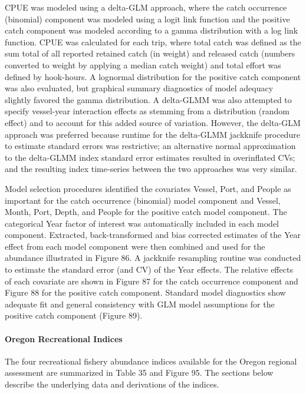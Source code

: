 \documentclass[11pt,
  english,
  letterpaper,
]{article}
\begin{document}
CPUE was modeled using a delta-GLM approach, where the catch occurrence (binomial) component was modeled using a logit link function and the positive catch component was modeled according to a gamma distribution with a log link function. CPUE was calculated for each trip, where total catch was defined as the sum total of all reported retained catch (in weight) and released catch (numbers converted to weight by applying a median catch weight) and total effort was defined by hook-hours. A lognormal distribution for the positive catch component was also evaluated, but graphical summary diagnostics of model adequacy slightly favored the gamma distribution. A delta-GLMM was also attempted to specify vessel-year interaction effects as stemming from a distribution (random effect) and to account for this added source of variation. However, the delta-GLM approach was preferred because runtime for the delta-GLMM jackknife procedure to estimate standard errors was restrictive; an alternative normal approximation to the delta-GLMM index standard error estimates resulted in overinflated CVs; and the resulting index time-series between the two approaches was very similar.

Model selection procedures identified the covariates Vessel, Port, and People as important for the catch occurrence (binomial) model component and Vessel, Month, Port, Depth, and People for the positive catch model component. The categorical Year factor of interest was automatically included in each model component. Extracted, back-transformed and bias corrected estimates of the Year effect from each model component were then combined and used for the abundance illustrated in Figure 86. A jackknife resampling routine was conducted to estimate the standard error (and CV) of the Year effects. The relative effects of each covariate are shown in Figure 87 for the catch occurrence component and Figure 88 for the positive catch component. Standard model diagnostics show adequate fit and general consistency with GLM model assumptions for the positive catch component (Figure 89).

\hypertarget{oregon-recreational-indices}{%
\paragraph{Oregon Recreational Indices}\label{oregon-recreational-indices}}

The four recreational fishery abundance indices available for the Oregon regional assessment are summarized in Table 35 and Figure 95. The sections below describe the underlying data and derivations of the indices.
\end{document}
